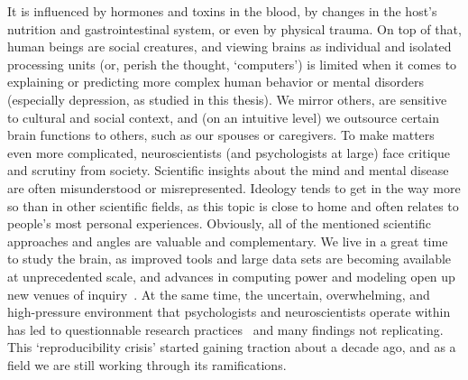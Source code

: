 It is influenced by hormones and toxins in the blood, by changes in the host's nutrition and gastrointestinal system, or even by physical trauma.
On top of that, human beings are social creatures, and viewing brains as individual and isolated processing units (or, perish the thought, `computers') is limited when it comes to explaining or predicting more complex human behavior or mental disorders (especially depression, as studied in this thesis).
We mirror others, are sensitive to cultural and social context, and (on an intuitive level) we outsource certain brain functions to others, such as our spouses or caregivers.
%
To make matters even more complicated, neuroscientists (and psychologists at large) face critique and scrutiny from society.
Scientific insights about the mind and mental disease are often misunderstood or misrepresented.
Ideology tends to get in the way more so than in other scientific fields, as this topic is close to home and often relates to people's most personal experiences.
%
Obviously, all of the mentioned scientific approaches and angles are valuable and complementary.
We live in a great time to study the brain, as improved tools and large data sets are becoming available at unprecedented scale, and advances in computing power and modeling open up new venues of inquiry~\parencite{Griffiths2015, Bzdok2017, Rutledge2019, Guest2021}.
%
At the same time, the uncertain, overwhelming, and high-pressure environment that psychologists and neuroscientists operate within has led to questionnable research practices~\parencite{John2012} and many findings not replicating.
This `reproducibility crisis' started gaining traction about a decade ago, and as a field we are still working through its ramifications.

